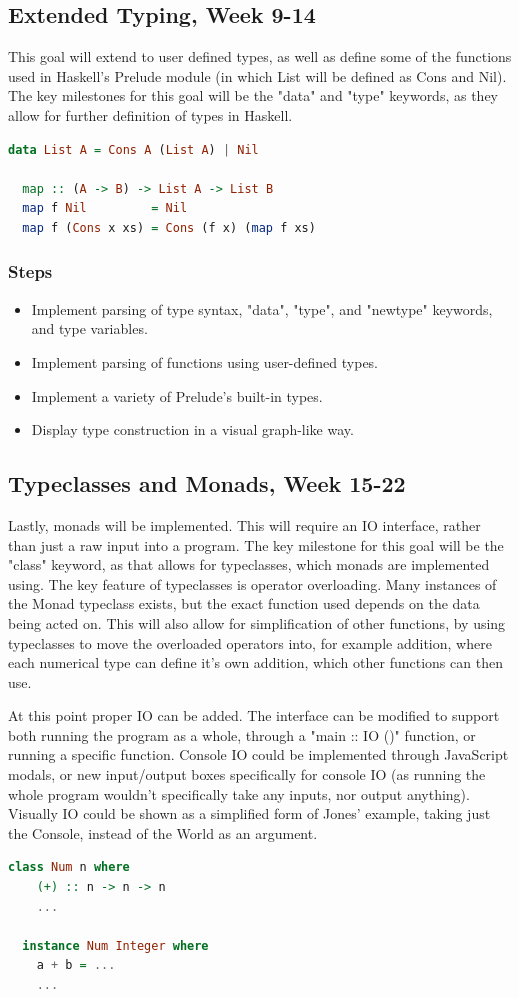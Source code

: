 \documentclass[a4paper]{article}
\begin{document}
\subsection{Extended Typing, Week 9-14}
\label{extended-typing}
This goal will extend to user defined types, as well as define some of the functions used in Haskell's Prelude module (in which List will be defined as Cons and Nil). The key milestones for this goal will be the "data" and "type" keywords, as they allow for further definition of types in Haskell.
\begin{lstlisting}[language=haskell, caption=Example functions/types of stage 2.]
  data List A = Cons A (List A) | Nil

  map :: (A -> B) -> List A -> List B
  map f Nil         = Nil
  map f (Cons x xs) = Cons (f x) (map f xs)
\end{lstlisting}
\subsubsection{Steps}
\begin{itemize}
    \item Implement parsing of type syntax, "data", "type", and "newtype" keywords, and type variables.
    \item Implement parsing of functions using user-defined types.
    \item Implement a variety of Prelude's built-in types.
    \item Display type construction in a visual graph-like way.
\end{itemize}
\subsection{Typeclasses and Monads, Week 15-22}
Lastly, monads will be implemented. This will require an IO interface, rather than just a raw input into a program. The key milestone for this goal will be the "class" keyword, as that allows for typeclasses, which monads are implemented using.
The key feature of typeclasses is operator overloading. Many instances of the Monad typeclass exists, but the exact function used depends on the data being acted on.
This will also allow for simplification of other functions, by using typeclasses to move the overloaded operators into, for example addition, where each numerical type can define it's own addition, which other functions can then use.

At this point proper IO can be added. The interface can be modified to support both running the program as a whole, through a "main :: IO ()" function, or running a specific function. Console IO could be implemented through JavaScript modals, or new input/output boxes specifically for console IO (as running the whole program wouldn't specifically take any inputs, nor output anything). Visually IO could be shown as a simplified form of Jones' example, taking just the Console, instead of the World as an argument.
\begin{lstlisting}[language=haskell, caption=The Num typeclass. (+) would be implemented in JavaScript.]
  class Num n where
    (+) :: n -> n -> n
    ...

  instance Num Integer where
    a + b = ...
    ...
\end{lstlisting}
\end{document}
